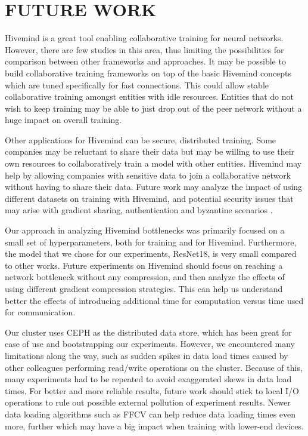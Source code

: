 \chapter{FUTURE WORK}\label{chapter:future-work}

Hivemind is a great tool enabling collaborative training for neural networks.
However, there are few studies in this area, thus limiting the possibilities for comparison between other frameworks and approaches.
It may be possible to build collaborative training frameworks on top of the basic Hivemind concepts which are tuned specifically for fast connections.
This could allow stable collaborative training amongst entities with idle resources.
Entities that do not wish to keep training may be able to just drop out of the peer network without a huge impact on overall training.

Other applications for Hivemind can be secure, distributed training.
Some companies may be reluctant to share their data but may be willing to use their own resources to collaboratively train a model with other entities.
Hivemind may help by allowing companies with sensitive data to join a collaborative network without having to share their data.
Future work may analyze the impact of using different datasets on training with Hivemind, and potential security issues that may arise with gradient sharing, authentication and byzantine scenarios \cite{DBLP:journals/corr/abs-2106-11257}.

Our approach in analyzing Hivemind bottlenecks was primarily focused on a small set of hyperparameters, both for training and for Hivemind.
Furthermore, the model that we chose for our experiments, ResNet18, is very small compared to other works.
Future experiments on Hivemind should focus on reaching a network bottleneck without any compression, and then analyze the effects of using different gradient compression strategies.
This can help us understand better the effects of introducing additional time for computation versus time used for communication.

Our cluster uses CEPH as the distributed data store, which has been great for ease of use and bootstrapping our experiments.
However, we encountered many limitations along the way, such as sudden spikes in data load times caused by other colleagues performing read/write operations on the cluster.
Because of this, many experiments had to be repeated to avoid exaggerated skews in data load times.
For better and more reliable results, future work should stick to local I/O operations to rule out possible external pollution of experiment results.
Newer data loading algorithms such as FFCV \cite{leclerc2022ffcv} can help reduce data loading times even more, further which may have a big impact when training with lower-end devices.

